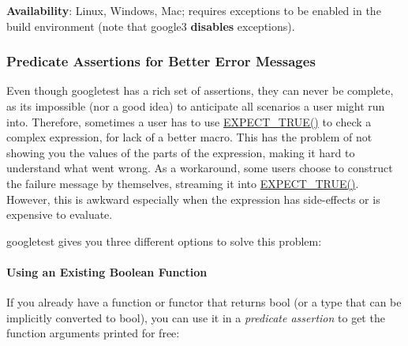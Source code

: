 {\bfseries{Availability}}\+: Linux, Windows, Mac; requires exceptions to be enabled in the build environment (note that {\ttfamily google3} {\bfseries{disables}} exceptions).

\subsubsection*{Predicate Assertions for Better Error Messages}

Even though googletest has a rich set of assertions, they can never be complete, as it\textquotesingle{}s impossible (nor a good idea) to anticipate all scenarios a user might run into. Therefore, sometimes a user has to use {\ttfamily \mbox{\hyperlink{googletest-master_2googletest_2include_2gtest_2gtest_8h_ac33e7cdfb5d44a7a0f0ab552eb5c3c6a}{E\+X\+P\+E\+C\+T\+\_\+\+T\+R\+U\+E()}}} to check a complex expression, for lack of a better macro. This has the problem of not showing you the values of the parts of the expression, making it hard to understand what went wrong. As a workaround, some users choose to construct the failure message by themselves, streaming it into {\ttfamily \mbox{\hyperlink{googletest-master_2googletest_2include_2gtest_2gtest_8h_ac33e7cdfb5d44a7a0f0ab552eb5c3c6a}{E\+X\+P\+E\+C\+T\+\_\+\+T\+R\+U\+E()}}}. However, this is awkward especially when the expression has side-\/effects or is expensive to evaluate.

googletest gives you three different options to solve this problem\+:

\paragraph*{Using an Existing Boolean Function}

If you already have a function or functor that returns {\ttfamily bool} (or a type that can be implicitly converted to {\ttfamily bool}), you can use it in a {\itshape predicate assertion} to get the function arguments printed for free\+:

